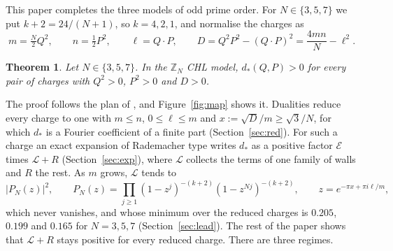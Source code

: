 \documentclass[11pt]{amsart}
\numberwithin{equation}{section}
\theoremstyle{plain}
\newtheorem{thm}{Theorem}[section]
\theoremstyle{definition}
\theoremstyle{remark}
\newcommand{\Z}{\mathbb{Z}}
\newcommand{\cE}{\mathcal{E}}
\newcommand{\cL}{\mathcal{L}}
\begin{document}
This paper completes the three models of odd prime order. For $N\in\{3,5,7\}$ we put $k+2=24/(N+1)$, so $k=4,2,1$, and normalise the charges as
\begin{equation}\label{eq:charges}
m=\tfrac N2Q^2,\qquad n=\tfrac12P^2,\qquad \ell=Q\cdot P,\qquad D=Q^2P^2-(Q\cdot P)^2=\frac{4mn}{N}-\ell^2 .
\end{equation}

\begin{thm}\label{thm:main}
Let $N\in\{3,5,7\}$. In the $\Z_N$ CHL model, $d_*(Q,P)>0$ for every pair of charges with $Q^2>0$, $P^2>0$ and $D>0$.
\end{thm}

The proof follows the plan of \cite{Bha26a}, and Figure~\ref{fig:map} shows it. Dualities reduce every charge to one with $m\le n$, $0\le\ell\le m$ and $x:=\sqrt D/m\ge\sqrt3/N$, for which $d_*$ is a Fourier coefficient of a finite part (Section~\ref{sec:red}). For such a charge an exact expansion of Rademacher type writes $d_*$ as a positive factor $\cE$ times $\cL+R$ (Section~\ref{sec:exp}), where $\cL$ collects the terms of one family of walls and $R$ the rest. As $m$ grows, $\cL$ tends to
\begin{equation}\label{eq:PN}
|P_N(z)|^2,\qquad P_N(z)=\prod_{j\ge1}(1-z^j)^{-(k+2)}(1-z^{Nj})^{-(k+2)},\qquad z=e^{-\pi x+\pi i\ell/m},
\end{equation}
which never vanishes, and whose minimum over the reduced charges is $0.205$, $0.199$ and $0.165$ for $N=3,5,7$ (Section~\ref{sec:lead}). The rest of the paper shows that $\cL+R$ stays positive for every reduced charge. There are three regimes.
\end{document}
